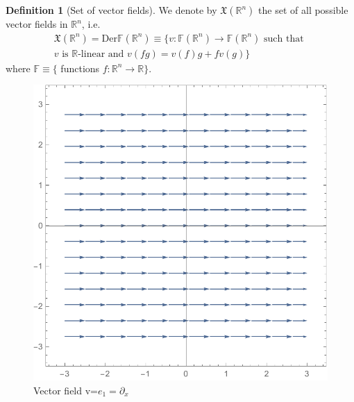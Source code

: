 \documentclass[a4paper,11pt,titlepage, article, oneside]{memoir}
\numberwithin{equation}{section}
\theoremstyle{definition}
\newtheorem{definition}[theorem]{Definition}
\theoremstyle{remark}
\newcommand{\rfield}{\mathbb{R}}
\begin{document}
\begin{definition} [Set of vector fields] \label{setsfields}
We denote by $\mathfrak{X}(\rfield^n)$ the set of all possible vector fields in $\rfield^n$, i.e.
\begin{align}
\mathfrak{X}(\rfield^n) = \text{Der}\mathbb{F}(\rfield^n) \equiv\{ v \colon \mathbb{F}(\rfield^n) \rightarrow \mathbb{F}(\rfield^n) \text{ such that } \nonumber \\
 v \text{ is } \rfield\text{-linear and } v(fg) = v(f)g + fv(g)  \}
\end{align}
where $\mathbb{F} \equiv \{$ functions $f\colon \rfield^n \rightarrow \rfield \}$.

\begin{figure}[h]
     \centering
     \includegraphics[width=.5\linewidth]{images/vfield_e1.pdf}
     \caption{Vector field v=$e_1=\partial_x$} \label{Fig:vfield_e1}
\end{figure}
\end{definition}
\end{document}
